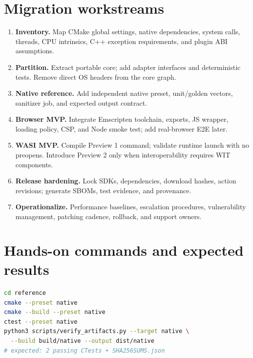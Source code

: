 \documentclass[11pt,letterpaper]{article}
\begin{document}
\section{Migration workstreams}
\begin{enumerate}
\item \textbf{Inventory.} Map CMake global settings, native dependencies, system calls, threads, CPU intrinsics, C++ exception requirements, and plugin ABI assumptions.
\item \textbf{Partition.} Extract portable core; add adapter interfaces and deterministic tests. Remove direct OS headers from the core graph.
\item \textbf{Native reference.} Add independent native preset, unit/golden vectors, sanitizer job, and expected output contract.
\item \textbf{Browser MVP.} Integrate Emscripten toolchain, exports, JS wrapper, loading policy, CSP, and Node smoke test; add real-browser E2E later.
\item \textbf{WASI MVP.} Compile Preview 1 command; validate runtime launch with no preopens. Introduce Preview 2 only when interoperability requires WIT components.
\item \textbf{Release hardening.} Lock SDKs, dependencies, download hashes, action revisions; generate SBOMs, test evidence, and provenance.
\item \textbf{Operationalize.} Performance baselines, escalation procedures, vulnerability management, patching cadence, rollback, and support owners.
\end{enumerate}

\section{Hands-on commands and expected results}
\begin{lstlisting}[language=bash,caption={Native validation and checksum inventory}]
cd reference
cmake --preset native
cmake --build --preset native
ctest --preset native
python3 scripts/verify_artifacts.py --target native \
  --build build/native --output dist/native
# expected: 2 passing CTests + SHA256SUMS.json
\end{lstlisting}
\end{document}

